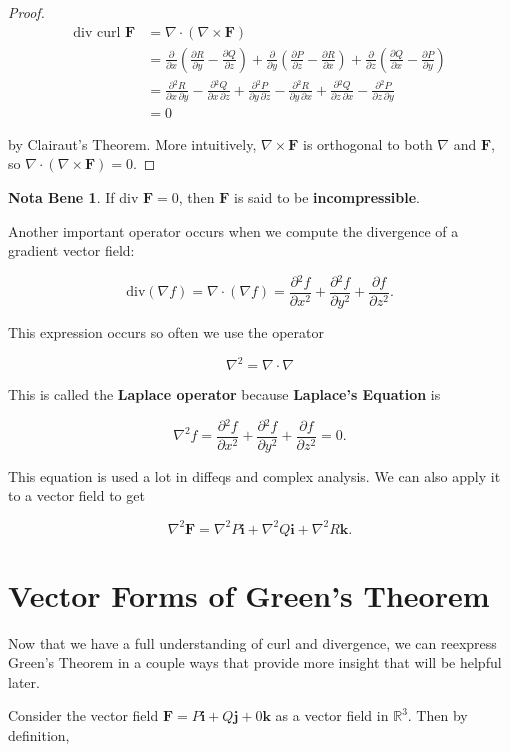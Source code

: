 \documentclass[11pt,oneside,english]{amsart}
\theoremstyle{definition}
\newtheorem*{note}{Nota Bene}
\newcommand{\R}{\mathbb{R}}
\newcommand{\pp}[2]{\frac{\partial{#1}}{\partial{#2}}}
\begin{document}
\begin{proof}
\begin{align*}
\text{div curl }\mathbf{F}&=\nabla \cdot(\nabla\times\mathbf{F})\\[2mm]
&=\pp{}{x}\left(\pp{R}{y}-\pp{Q}{z}\right)+\pp{}{y}\left(\pp{P}{z}-\pp{R}{x}\right)+\pp{}{z}\left(\pp{Q}{x}-\pp{P}{y}\right)\\[2mm]
&=\pp{^2R}{x\,\partial y}-\pp{^2Q}{x\,\partial z}+\pp{^2P}{y\,\partial z}-\pp{^2R}{y\,\partial x}+\pp{^2Q}{z\,\partial x}-\pp{^2P}{z\,\partial y}\\[2mm]
&=0
\end{align*}

by Clairaut's Theorem. More intuitively, $\nabla\times\mathbf{F}$ is orthogonal to both $\nabla$ and $\mathbf{F}$, so $\nabla\cdot(\nabla\times\mathbf{F})=0$.
\end{proof}

\begin{note}
If div $\mathbf{F}=0$, then $\mathbf{F}$ is said to be \textbf{incompressible}.
\end{note}

Another important operator occurs when we compute the divergence of a gradient vector field:

\[
\text{div}(\nabla f)=\nabla \cdot(\nabla f)=\pp{^2f}{x^2}+\pp{^2f}{y^2}+\pp{f}{z^2}.
\]

This expression occurs so often we use the operator

\[
\nabla^2=\nabla \cdot \nabla
\]

This is called the \textbf{Laplace operator} because \textbf{Laplace's Equation} is

\[
\nabla ^2f=\pp{^2f}{x^2}+\pp{^2f}{y^2}+\pp{f}{z^2}=0.
\]

This equation is used a lot in diffeqs and complex analysis. We can also apply it to a vector field to get

\[
\nabla ^2\mathbf{F}=\nabla ^2P\mathbf{i}+\nabla^2Q\mathbf{i}+\nabla^2R\mathbf{k}.
\]

\section*{Vector Forms of Green's Theorem}

Now that we have a full understanding of curl and divergence, we can reexpress Green's Theorem in a couple ways that provide more insight that will be helpful later.

Consider the vector field $\mathbf{F}=P\mathbf{i}+Q\mathbf{j}+0\mathbf{k}$ as a vector field in $\R^3$. Then by definition,
\end{document}
